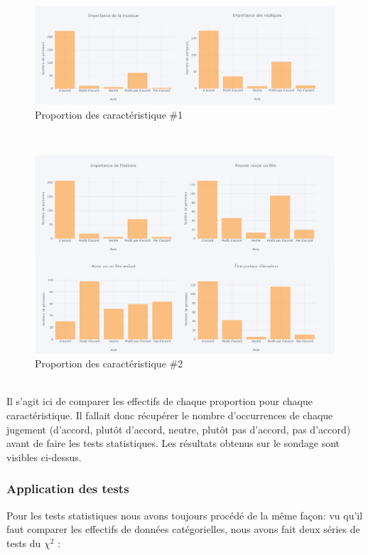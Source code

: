 \documentclass{article} %
\begin{document}
\begin{figure}[!h]
	\centering
	\includegraphics[keepaspectratio,scale=0.6]{h91.png}
	\caption{Proportion des caractéristique \#1}
\end{figure}~\\
\newpage
\begin{figure}[!h]
	\centering
	\includegraphics[keepaspectratio,scale=0.6]{h9.png}
	\caption{Proportion des caractéristique \#2}
\end{figure}~\\
Il s’agit ici de comparer les effectifs de chaque proportion pour chaque caractéristique. Il fallait donc récupérer le nombre d'occurrences de chaque jugement (d’accord, plutôt d’accord, neutre, plutôt pas d’accord, pas d’accord) avant de faire les tests statistiques. Les résultats obtenus sur le sondage sont visibles ci-dessus. 
\subsubsection{Application des tests}
Pour les tests statistiques nous avons toujours procédé de la même façon: vu qu’il faut comparer les effectifs de données catégorielles, nous avons fait deux séries de tests du $\chi^2$ :
\end{document}
